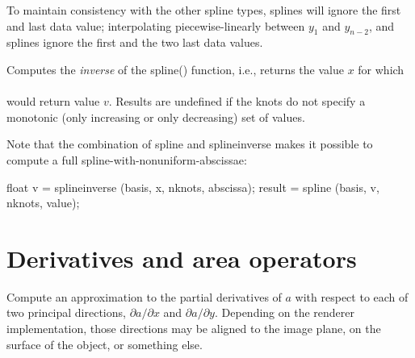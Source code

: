 \documentclass[11pt,letterpaper]{book}
\begin{document}
To maintain consistency with the other spline types,  splines will
ignore the first and last data value; interpolating piecewise-linearly
between $y_1$ and $y_{n-2}$, and  splines ignore the first
and the two last data values.
\apiend


Computes the \emph{inverse} of the {\cf spline()} function, i.e., returns
the value $x$ for which \\
   \\ 
would return value
$v$.  Results are undefined if the knots do not specify a monotonic
(only increasing or only decreasing) set of values.

Note that the combination of {\cf spline} and {\cf splineinverse} makes
it possible to compute a full spline-with-nonuniform-abscissae:
\begin{smallcode}
    float v = splineinverse (basis, x, nknots, abscissa);
    result = spline (basis, v, nknots, value);
\end{smallcode}
\apiend


\newpage
\section{Derivatives and area operators}
\label{sec:stdlib:derivs}

 
Compute an approximation to the partial derivatives of $a$ with respect to
each of two principal directions, $\partial a / \partial x$ and
$\partial a / \partial y$.  Depending on the renderer
implementation, those directions may be aligned to the image plane,
on the surface of the object, or something else.
\end{document}
